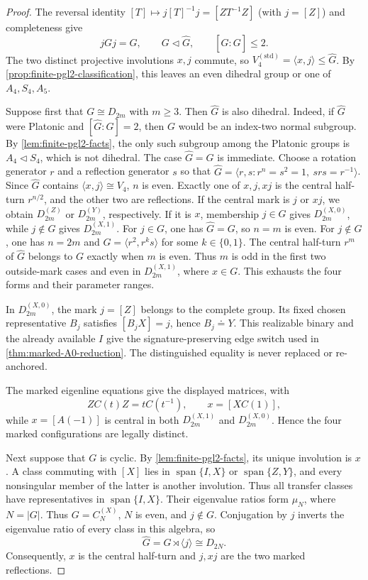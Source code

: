 \documentclass[11pt,letterpaper,onecolumn]{article}
\theoremstyle{plain}
\theoremstyle{definition}
\theoremstyle{remark}
\newcommand{\DihZ}[1]{{D_{#1}^{(Z)}}}
\newcommand{\DihY}[1]{{D_{#1}^{(Y)}}}
\newcommand{\DihXzero}[1]{{D_{#1}^{(X,0)}}}
\newcommand{\DihXone}[1]{{D_{#1}^{(X,1)}}}
\newcommand{\CycX}[1]{{C_{#1}^{(X)}}}
\newcommand{\KleinStd}{{V_4^{(\mathrm{std})}}}
\newcommand{\Span}{\operatorname{span}}
\begin{document}
\begin{proof}
The reversal identity
\([T]\mapsto j[T]^{-1}j=[ZT^{-1}Z]\) (with \(j=[Z]\)) and completeness give
\[
 jGj=G,\qquad G\triangleleft \widehat G,\qquad [\widehat G:G]\le2.
\]
The two distinct projective involutions \(x,j\) commute, so
\(\KleinStd=\langle x,j\rangle\le\widehat G\).  By
\cref{prop:finite-pgl2-classification}, this leaves an even dihedral group
or one of \(A_4,S_4,A_5\).

Suppose first that \(G\cong D_{2m}\) with \(m\ge3\).  Then \(\widehat G\) is also
dihedral.  Indeed, if \(\widehat G\) were Platonic and \([\widehat G:G]=2\), then \(G\)
would be an index-two normal subgroup.  By
\cref{lem:finite-pgl2-facts}, the only such subgroup among the Platonic
groups is \(A_4\triangleleft S_4\), which is not dihedral.  The case
\(\widehat G=G\) is immediate.  Choose a rotation generator \(r\) and a reflection
generator \(s\) so that
\(\widehat G=\langle r,s:r^n=s^2=1,\ srs=r^{-1}\rangle\).
Since \(\widehat G\) contains \(\langle x,j\rangle\cong V_4\), \(n\) is even.
Exactly one of \(x,j,xj\) is the central half-turn \(r^{n/2}\), and
the other two are reflections.  If the central mark is \(j\) or \(xj\),
we obtain \(\DihZ{2m}\) or \(\DihY{2m}\), respectively.
If it is \(x\), membership \(j\in G\) gives \(\DihXzero{2m}\),
while \(j\notin G\) gives \(\DihXone{2m}\).
For \(j\in G\), one has \(\widehat G=G\), so \(n=m\) is even.
For \(j\notin G\), one has \(n=2m\) and
\(G=\langle r^2,r^ks\rangle\) for some \(k\in\{0,1\}\).
The central half-turn \(r^m\) of \(\widehat G\) belongs to \(G\) exactly when \(m\) is even.
Thus \(m\) is odd in the first two outside-mark cases and even in
\(\DihXone{2m}\), where \(x\in G\).  This exhausts the four forms
and their parameter ranges.

In \(\DihXzero{2m}\), the mark \(j=[Z]\) belongs to the complete group.
Its fixed chosen representative \(B_j\) satisfies
\([B_jX]=j\), hence \(B_j\doteq Y\).  This realizable binary and the already
available \(I\) give the signature-preserving edge switch used in
\cref{thm:marked-A0-reduction}. The distinguished equality is never
replaced or re-anchored.

The marked eigenline equations give the displayed matrices, with
\[
 ZC(t)Z=tC(t^{-1}),\qquad
 x=[XC(1)],
\]
while \(x=[A(-1)]\) is central in both \(\DihXone{2m}\) and
\(\DihXzero{2m}\). Hence the four marked configurations are legally distinct.

Next suppose that \(G\) is cyclic.  By
\cref{lem:finite-pgl2-facts}, its unique involution is \(x\).  A class
commuting with \([X]\) lies in \(\Span\{I,X\}\) or
\(\Span\{Z,Y\}\), and every nonsingular member of the latter is another
involution.  Thus all transfer classes have representatives in
\(\Span\{I,X\}\). Their eigenvalue ratios form \(\mu_N\), where \(N=|G|\).
Thus \(G=\CycX{N}\), \(N\) is even, and \(j\notin G\). Conjugation by \(j\) inverts the eigenvalue ratio of every
class in this algebra, so
\[
 \widehat G=G\rtimes\langle j\rangle\cong D_{2N}.
\]
Consequently, \(x\) is the central half-turn and \(j,xj\) are the two
marked reflections.


\end{proof}
\end{document}
